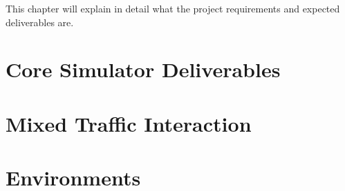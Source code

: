 This chapter will explain in detail what the project requirements and expected deliverables are. 
\section{Core Simulator Deliverables}

\section{Mixed Traffic Interaction}

\section{Environments}






